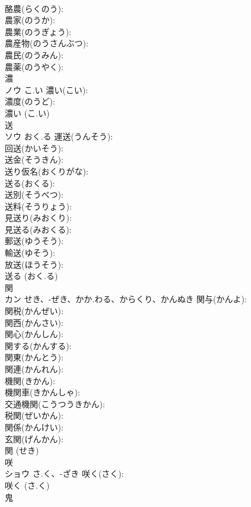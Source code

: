 \documentclass[8pt]{extreport}
\begin{document}
\begin{CJK}{UTF8}{min}
\\	酪農(らくのう): 
\\	農家(のうか): 
\\	農業(のうぎょう): 
\\	農産物(のうさんぶつ): 
\\	農民(のうみん): 
\\	農薬(のうやく): 
\\	濃			
\\	ノウ	こ.い	濃い(こい): 
\\	濃度(のうど): 
\\	濃い (こ.い)
\\	送			
\\	ソウ	おく.る	運送(うんそう): 
\\	回送(かいそう): 
\\	送金(そうきん): 
\\	送り仮名(おくりがな): 
\\	送る(おくる): 
\\	送別(そうべつ): 
\\	送料(そうりょう): 
\\	見送り(みおくり): 
\\	見送る(みおくる): 
\\	郵送(ゆうそう): 
\\	輸送(ゆそう): 
\\	放送(ほうそう): 
\\	送る (おく.る)
\\	関			
\\	カン	せき、-ぜき、かか.わる、からくり、かんぬき	関与(かんよ): 
\\	関税(かんぜい): 
\\	関西(かんさい): 
\\	関心(かんしん): 
\\	関する(かんする): 
\\	関東(かんとう): 
\\	関連(かんれん): 
\\	機関(きかん): 
\\	機関車(きかんしゃ): 
\\	交通機関(こうつうきかん): 
\\	税関(ぜいかん): 
\\	関係(かんけい): 
\\	玄関(げんかん): 
\\	関 (せき)
\\	咲			
\\	ショウ	さ.く、-ざき	咲く(さく): 
\\	咲く (さ.く)
\\	鬼			

\end{CJK}
\end{document}
